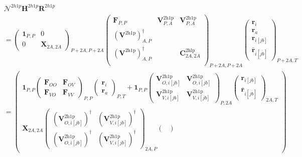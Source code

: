 \begin{align}
&    \bm{\mathcal{N}}^{2h1p} \bm{H}^{2h1p} \bm{R}^{2h1p}\\
&= 
\begin{pmatrix}\bm{1}_{P,P} & 0 \\
0 & \bm{X}_{2A,2A}
\end{pmatrix}_{P+2A, P+2A}
\begin{pmatrix}\bm{F}_{P,P} & \bm{V}^{2\mathrm{h1p}}_{P,A} & \bm{V}^{2\mathrm{h1p}}_{P,A} \\
\left(\bm{V}^{2\mathrm{h1p}}\right)^{\dagger}_{A,P} &  &   \\
\left(\bm{V}^{2\mathrm{h1p}}\right)^{\dagger}_{A,P} &  & \bm{C}^{2\mathrm{hlp}}_{2A,2A} \\
\end{pmatrix}_{P+2A, P+2A}
\begin{pmatrix}\bm{r}_i \\ \bm{r}_a \\ \bm{r}_{i[jb]} \\ \bm{\bar{r}}_{i[\bar{jb}]}
\end{pmatrix}_{P+2A,T} \\
&= 
\begin{pmatrix}
\bm{1}_{P,P}
 \begin{pmatrix}
\bm{F}_{OO} & \bm{F}_{OV} \\ \bm{F}_{VO} & \bm{F}_{VV}
\end{pmatrix}_{P,P} \begin{pmatrix}
\bm{r}_i \\ \bm{r}_a
\end{pmatrix}_{P,T} + \bm{1}_{P,P} \begin{pmatrix}
\bm{V}^{2 \mathrm{h1p}}_{O,i[jb]} & \bm{V}^{2 \mathrm{h1p}}_{O,i[{jb}]} \\ \bm{V}^{2 \mathrm{h1p}}_{V,i[jb]} & \bm{V}^{2 \mathrm{h1p}}_{V,i[{jb}]} 
\end{pmatrix}_{P,2A} \begin{pmatrix}
    \bm{r}_{i[jb]} \\
\bm{\bar{r}}_{i[\bar{jb}]}
\end{pmatrix}_{2A,T} \\
\bm{X}_{2A,2A} \begin{pmatrix}\left(\bm{V}^{2 \mathrm{h1p}}_{O,i[jb]}\right)^\dag & \left(\bm{V}^{2 \mathrm{h1p}}_{V,i[{jb}]}\right)^\dag \\ \left(\bm{V}^{2 \mathrm{h1p}}_{O,i[jb]}\right)^\dag & \left(\bm{V}^{2 \mathrm{h1p}}_{V,i[{jb}]}\right)^\dag\end{pmatrix}_{2A,P} \begin{pmatrix}

\end{pmatrix}
\end{pmatrix}
\end{align}
